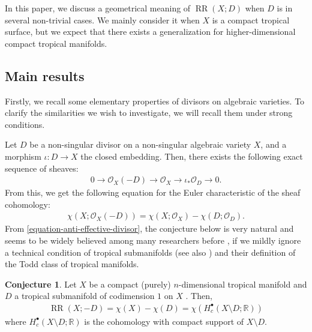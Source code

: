 \documentclass[a4paper,dvipdfmx,reqno,12pt]{amsart}
\theoremstyle{definition}
\newtheorem{conjecture}[theorem]{Conjecture}
\newcommand{\opn}[1]{\operatorname{#1}}
\numberwithin{equation}{section}
\begin{document}
In this paper, we discuss
a geometrical meaning of $\opn{RR}(X;D)$
when $D$ is in several non-trivial cases.
We mainly consider it when $X$ is
a compact tropical surface, but we expect 
that there exists a generalization for
higher-dimensional compact tropical manifolds.

\subsection{Main results}

Firstly, we recall some elementary properties
of divisors on algebraic varieties. 
To clarify the similarities we wish to investigate,
we will recall them under strong conditions.

Let $D$ be a non-singular divisor on a non-singular
algebraic variety $X$, and a morphism  
$\iota\colon D\to X$ the closed embedding.
Then, there exists the following exact sequence
of sheaves:
\begin{align}
     0\to \mathcal{O}_X(-D)\to 
\mathcal{O}_X\to \iota_*\mathcal{O}_D\to 0.
\end{align}
From this, we get the following equation for the Euler
characteristic of the sheaf cohomology:
\begin{align}
\label{equation-anti-effective-divisor}
\chi(X;\mathcal{O}_X(-D))=\chi(X;\mathcal{O}_X)
-\chi(D;\mathcal{O}_D).
\end{align}
From \eqref{equation-anti-effective-divisor},
the conjecture below is very natural and 
seems to be widely
believed among many researchers
before \cite{demedrano2023chern}, if
we mildly ignore a technical condition of 
tropical submanifolds 
\cite[Definition 2.14]{demedrano2023chern}
(see also
\cite[Definition 4.3]{shaw2015tropical})
and their definition of the Todd class of
tropical manifolds.

\begin{conjecture}
\label{conjecture-rr-c-euler}
Let $X$ be a compact
(purely) $n$-dimensional tropical manifold and
$D$ a tropical submanifold of codimension $1$
on $X$ 
\cite[Definition 2.14]{demedrano2023chern}.
Then,
\begin{align}
\opn{RR}(X;-D)=
\chi (X)-\chi(D)=
\chi (H^{\bullet}_c(X\setminus D;\mathbb{R}))
\end{align}
where $H_c^{\bullet}(X\setminus D;\mathbb{R})$ 
is the cohomology with compact support of $X\setminus D$.
\end{conjecture}
\end{document}
